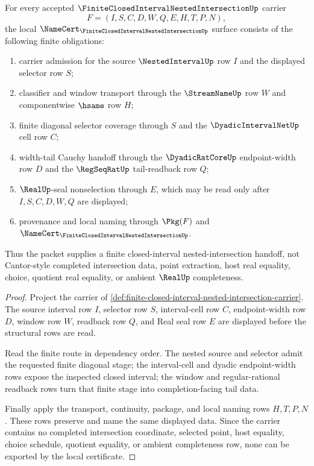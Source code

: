 \begin{theorem}
\label{thm:finite-closed-interval-nested-intersection-obligation-surface}
For every accepted $\FiniteClosedIntervalNestedIntersectionUp$ carrier
$$
F=(I,S,C,D,W,Q,E,H,T,P,N),
$$
the local $\NameCert_{\FiniteClosedIntervalNestedIntersectionUp}$ surface consists of the following finite obligations:
\begin{enumerate}
\item carrier admission for the source $\NestedIntervalUp$ row $I$ and the displayed selector row $S$;
\item classifier and window transport through the $\StreamNameUp$ row $W$ and componentwise $\hsame$ row $H$;
\item finite diagonal selector coverage through $S$ and the $\DyadicIntervalNetUp$ cell row $C$;
\item width-tail Cauchy handoff through the $\DyadicRatCoreUp$ endpoint-width row $D$ and the $\RegSeqRatUp$ tail-readback row $Q$;
\item $\RealUp$-seal nonselection through $E$, which may be read only after $I,S,C,D,W,Q$ are displayed;
\item provenance and local naming through $\Pkg(F)$ and $\NameCert_{\FiniteClosedIntervalNestedIntersectionUp}$.
\end{enumerate}
Thus the packet supplies a finite closed-interval nested-intersection handoff, not Cantor-style completed intersection data, point extraction, host real equality, choice, quotient real equality, or ambient $\RealUp$ completeness.
\end{theorem}
\begin{proof}
Project the carrier of \autoref{def:finite-closed-interval-nested-intersection-carrier}. The source interval row $I$, selector row $S$, interval-cell row $C$, endpoint-width row $D$, window row $W$, readback row $Q$, and Real seal row $E$ are displayed before the structural rows are read.

Read the finite route in dependency order. The nested source and selector admit the requested finite diagonal stage; the interval-cell and dyadic endpoint-width rows expose the inspected closed interval; the window and regular-rational readback rows turn that finite stage into completion-facing tail data.

Finally apply the transport, continuity, package, and local naming rows $H,T,P,N$. These rows preserve and name the same displayed data. Since the carrier contains no completed intersection coordinate, selected point, host equality, choice schedule, quotient equality, or ambient completeness row, none can be exported by the local certificate.
\end{proof}

